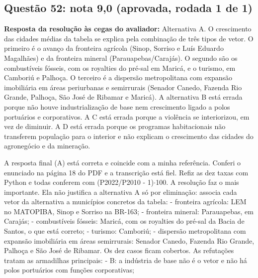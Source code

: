 \documentclass{article}%
\begin{document}
\subsection*{Questão 52: nota 9,0 (aprovada, rodada 1 de 1)}%
\textbf{Resposta da resolução às cegas do avaliador:} Alternativa A. O crescimento das cidades médias da tabela se explica pela combinação de três tipos de vetor. O primeiro é o avanço da fronteira agrícola (Sinop, Sorriso e Luís Eduardo Magalhães) e da fronteira mineral (Parauapebas/Carajás). O segundo são os combustíveis fósseis, com os royalties do pré{-}sal em Maricá, e o turismo, em Camboriú e Palhoça. O terceiro é a dispersão metropolitana com expansão imobiliária em áreas periurbanas e semirrurais (Senador Canedo, Fazenda Rio Grande, Palhoça, São José de Ribamar e Maricá). A alternativa B está errada porque não houve industrialização de base nem crescimento ligado a polos portuários e corporativos. A C está errada porque a violência se interiorizou, em vez de diminuir. A D está errada porque os programas habitacionais não transferem população para o interior e não explicam o crescimento das cidades do agronegócio e da mineração.\par %
A resposta final (A) está correta e coincide com a minha referência. Conferi o enunciado na página 18 do PDF e a transcrição está fiel. Refiz as dez taxas com Python e todas conferem com (P2022/P2010 - 1)$\cdot$100.\newline%
\newline%
A resolução faz o mais importante. Ela não justifica a alternativa A só por eliminação: associa cada vetor da alternativa a municípios concretos da tabela:\newline%
{-} fronteira agrícola: LEM no MATOPIBA, Sinop e Sorriso na BR{-}163;\newline%
{-} fronteira mineral: Parauapebas, em Carajás;\newline%
{-} combustíveis fósseis: Maricá, com os royalties do pré{-}sal da Bacia de Santos, o que está correto;\newline%
{-} turismo: Camboriú;\newline%
{-} dispersão metropolitana com expansão imobiliária em áreas semirrurais: Senador Canedo, Fazenda Rio Grande, Palhoça e São José de Ribamar.\newline%
Os dez casos ficam cobertos.\newline%
\newline%
As refutações tratam as armadilhas principais:\newline%
{-} B: a indústria de base não é o vetor e não há polos portuários com funções corporativas;\newline%
\end{document}
